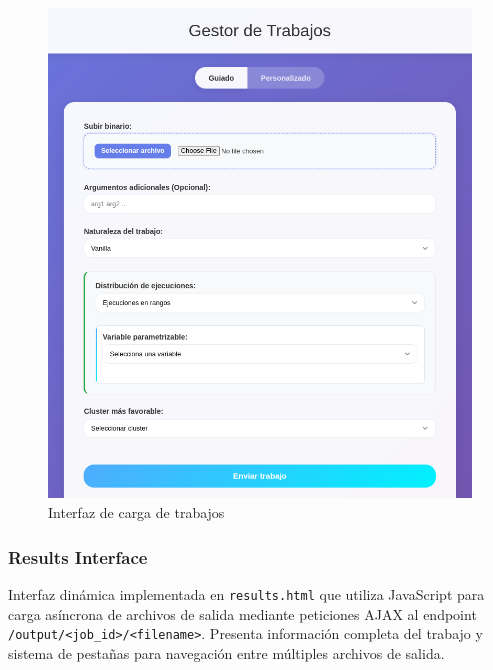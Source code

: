 \begin{figure}[H]
	\centering
	\includegraphics[scale=0.5]{tablas-images/pmv/upload-ui-screenshot.png}
	\caption{Interfaz de carga de trabajos}
	\label{fig:uiCargasTrabajos}
\end{figure}

\subsubsection{Results Interface}
\noindent
Interfaz dinámica implementada en \texttt{results.html} que utiliza JavaScript para carga asíncrona de archivos de salida mediante peticiones AJAX al endpoint \texttt{/output/<job\_id>/<filename>}. Presenta información completa del trabajo y sistema de pestañas para navegación entre múltiples archivos de salida.

